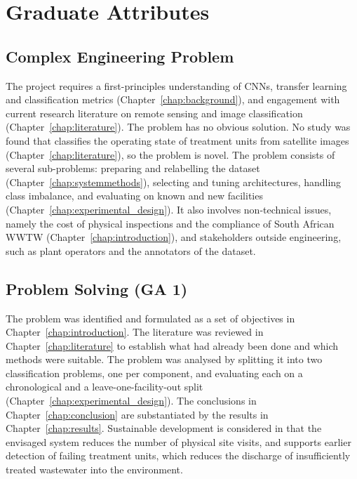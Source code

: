 \chapter{Graduate Attributes}{}
\makeatletter{}\makeatother
\label{appen:graduate_attributes}

\section{Complex Engineering Problem}
The project requires a first-principles understanding of CNNs, transfer learning and classification metrics (Chapter~\ref{chap:background}), and engagement with current research literature on remote sensing and image classification (Chapter~\ref{chap:literature}). The problem has no obvious solution. No study was found that classifies the operating state of treatment units from satellite images (Chapter~\ref{chap:literature}), so the problem is novel. The problem consists of several sub-problems: preparing and relabelling the dataset (Chapter~\ref{chap:systemmethods}), selecting and tuning architectures, handling class imbalance, and evaluating on known and new facilities (Chapter~\ref{chap:experimental_design}). It also involves non-technical issues, namely the cost of physical inspections and the compliance of South African WWTW (Chapter~\ref{chap:introduction}), and stakeholders outside engineering, such as plant operators and the annotators of the dataset.

\section{Problem Solving (GA 1)}
The problem was identified and formulated as a set of objectives in Chapter~\ref{chap:introduction}. The literature was reviewed in Chapter~\ref{chap:literature} to establish what had already been done and which methods were suitable. The problem was analysed by splitting it into two classification problems, one per component, and evaluating each on a chronological and a leave-one-facility-out split (Chapter~\ref{chap:experimental_design}). The conclusions in Chapter~\ref{chap:conclusion} are substantiated by the results in Chapter~\ref{chap:results}. Sustainable development is considered in that the envisaged system reduces the number of physical site visits, and supports earlier detection of failing treatment units, which reduces the discharge of insufficiently treated wastewater into the environment.

